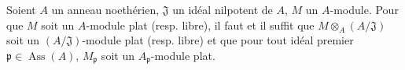 \begin{corollary}[11.4.9]
\label{IV.11.4.9-fr}
Soient $A$ un anneau noethérien, $\mathfrak J$ un idéal nilpotent de $A$, $M$
un $A$-module. Pour que $M$ soit un $A$-module plat (resp. libre), il faut et
il suffit que $M\otimes_A(A/\mathfrak J)$ soit un $(A/\mathfrak J)$-module
plat (resp. libre) et que pour tout idéal premier
$\mathfrak p\in\operatorname{Ass}(A)$, $M_\mathfrak p$ soit un
$A_\mathfrak p$-module plat.
\end{corollary}

